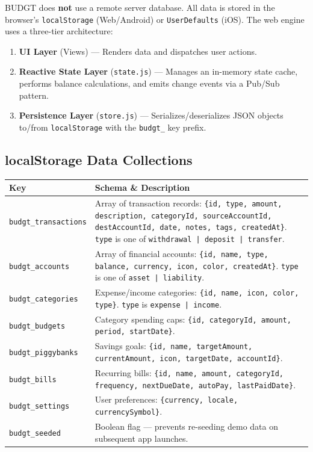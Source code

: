 \documentclass[12pt, a4paper]{article}
\begin{document}
BUDGT does \textbf{not} use a remote server database. All data is stored in the browser's \texttt{localStorage} (Web/Android) or \texttt{UserDefaults} (iOS). The web engine uses a three-tier architecture:

\begin{enumerate}[leftmargin=1.5em]
  \item \textbf{UI Layer} (Views) --- Renders data and dispatches user actions.
  \item \textbf{Reactive State Layer} (\texttt{state.js}) --- Manages an in-memory state cache, performs balance calculations, and emits change events via a Pub/Sub pattern.
  \item \textbf{Persistence Layer} (\texttt{store.js}) --- Serializes/deserializes JSON objects to/from \texttt{localStorage} with the \texttt{budgt\_} key prefix.
\end{enumerate}

\subsection{localStorage Data Collections}

\begin{longtable}{L{3.8cm} L{10.7cm}}
  \toprule
  \textbf{Key} & \textbf{Schema \& Description} \\
  \midrule
  \endhead
  \texttt{budgt\_transactions} & Array of transaction records: \texttt{\{id, type, amount, description, categoryId, sourceAccountId, destAccountId, date, notes, tags, createdAt\}}. \texttt{type} is one of \texttt{withdrawal | deposit | transfer}. \\[4pt]
  \texttt{budgt\_accounts} & Array of financial accounts: \texttt{\{id, name, type, balance, currency, icon, color, createdAt\}}. \texttt{type} is one of \texttt{asset | liability}. \\[4pt]
  \texttt{budgt\_categories} & Expense/income categories: \texttt{\{id, name, icon, color, type\}}. \texttt{type} is \texttt{expense | income}. \\[4pt]
  \texttt{budgt\_budgets} & Category spending caps: \texttt{\{id, categoryId, amount, period, startDate\}}. \\[4pt]
  \texttt{budgt\_piggybanks} & Savings goals: \texttt{\{id, name, targetAmount, currentAmount, icon, targetDate, accountId\}}. \\[4pt]
  \texttt{budgt\_bills} & Recurring bills: \texttt{\{id, name, amount, categoryId, frequency, nextDueDate, autoPay, lastPaidDate\}}. \\[4pt]
  \texttt{budgt\_settings} & User preferences: \texttt{\{currency, locale, currencySymbol\}}. \\[4pt]
  \texttt{budgt\_seeded} & Boolean flag --- prevents re-seeding demo data on subsequent app launches. \\
  \bottomrule
\end{longtable}
\end{document}
